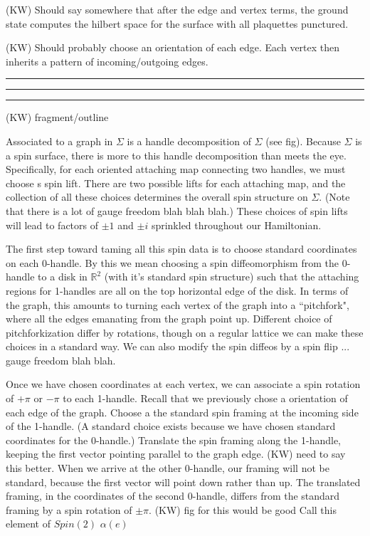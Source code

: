 \documentclass[12pt,a4paper]{article}
\newcommand{\rr}{\mathbb{R}}
\newcommand{\kw}[1]{{\color{kwcolor}\footnotesize{(KW) #1}}}
\newcommand{\kwsep}{\bigskip\hrule\medskip\hrule\medskip\hrule\bigskip}
\begin{document}
\kw{Should say somewhere that after the edge and vertex terms, the ground state computes the hilbert space
for the surface with all plaquettes punctured.}

\kw{Should probably choose an orientation of each edge.
Each vertex then inherits a pattern of incoming/outgoing edges.}

\kwsep

\kw{fragment/outline}

Associated to a graph in $\Sigma$ is a handle decomposition of $\Sigma$ (see fig).
Because $\Sigma$ is a spin surface, there is more to this handle decomposition than meets the eye.
Specifically, for each oriented attaching map connecting two handles, we must choose s spin lift.
There are two possible lifts for each attaching map, and the collection of all these choices determines
the overall spin structure on $\Sigma$.
(Note that there is a lot of gauge freedom blah blah blah.)
These choices of spin lifts will lead to factors of $\pm 1$ and $\pm i$ sprinkled throughout our Hamiltonian.

The first step toward taming all this spin data is to choose standard coordinates on each 0-handle.
By this we mean choosing a spin diffeomorphism from the 0-handle to a disk in $\rr^2$ (with it's standard
spin structure)
such that the attaching regions for 1-handles are all on the top horizontal edge of the disk.
In terms of the graph, this amounts to turning each vertex of the graph into a ``pitchfork",
where all the edges emanating from the graph point up.
Different choice of pitchforkization differ by rotations, though on a regular lattice
we can make these choices in a standard way.
We can also modify the spin diffeos by a spin flip ... gauge freedom blah blah.

Once we have chosen coordinates at each vertex, we can associate a spin rotation of $+\pi$ or
$-\pi$ to each 1-handle.
Recall that we previously chose a orientation of each edge of the graph.
Choose a the standard spin framing at the incoming side of the 1-handle.
(A standard choice exists because we have chosen standard coordinates for the 0-handle.)
Translate the spin framing along the 1-handle, keeping the first vector pointing parallel to the graph edge.
\kw{need to say this better}.
When we arrive at the other 0-handle, our framing will not be standard, because the first vector will point
down rather than up.
The translated framing, in the coordinates of the second 0-handle, differs from the standard framing by a spin rotation
of $\pm\pi$.
\kw{fig for this would be good}
Call this element of $Spin(2)$ $\alpha(e)$
\end{document}

